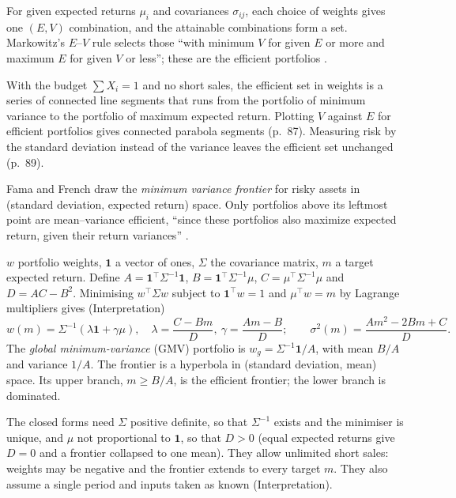 \begin{qfmethod}\label{meth:efficient-frontier}
 For given expected returns $\mu_i$ and covariances $\sigma_{ij}$, each choice of weights gives one $(E,V)$ combination, and the attainable combinations form a set. Markowitz's $E$--$V$ rule selects those ``with minimum $V$ for given $E$ or more and maximum $E$ for given $V$ or less''; these are the efficient portfolios \citep[\emph{Journal of Finance} 7(1), 1952, p.~82]{s6-markowitz}.

With the budget $\sum X_i=1$ and no short sales, the efficient set in weights is a series of connected line segments that runs from the portfolio of minimum variance to the portfolio of maximum expected return. Plotting $V$ against $E$ for efficient portfolios gives connected parabola segments (p.~87). Measuring risk by the standard deviation instead of the variance leaves the efficient set unchanged (p.~89).

Fama and French draw the \emph{minimum variance frontier} for risky assets in (standard deviation, expected return) space. Only portfolios above its leftmost point are mean--variance efficient, ``since these portfolios also maximize expected return, given their return variances'' \citep[\emph{JEP} 18(3), 2004, pp.~26--27 and Fig.~1]{capm-theory-evidence-2004}.

 $w$ portfolio weights, $\mathbf 1$ a vector of ones, $\Sigma$ the covariance matrix, $m$ a target expected return. Define $A=\mathbf 1^\top\Sigma^{-1}\mathbf 1$, $B=\mathbf 1^\top\Sigma^{-1}\mu$, $C=\mu^\top\Sigma^{-1}\mu$ and $D=AC-B^2$. Minimising $w^\top\Sigma w$ subject to $\mathbf 1^\top w=1$ and $\mu^\top w=m$ by Lagrange multipliers gives (Interpretation)
\[ w(m)=\Sigma^{-1}(\lambda\mathbf 1+\gamma\mu),\quad \lambda=\frac{C-Bm}{D},\ \gamma=\frac{Am-B}{D};\qquad \sigma^2(m)=\frac{Am^2-2Bm+C}{D}. \]
The \emph{global minimum-variance} (GMV) portfolio is $w_g=\Sigma^{-1}\mathbf 1/A$, with mean $B/A$ and variance $1/A$. The frontier is a hyperbola in (standard deviation, mean) space. Its upper branch, $m\ge B/A$, is the efficient frontier; the lower branch is dominated.

 The closed forms need $\Sigma$ positive definite, so that $\Sigma^{-1}$ exists and the minimiser is unique, and $\mu$ not proportional to $\mathbf 1$, so that $D>0$ (equal expected returns give $D=0$ and a frontier collapsed to one mean). They allow unlimited short sales: weights may be negative and the frontier extends to every target $m$. They also assume a single period and inputs taken as known (Interpretation).


\end{qfmethod}
